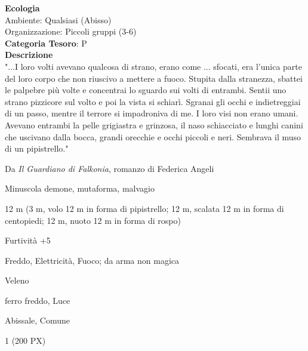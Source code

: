 \begin{multicols}{2}
{\textbf{Ecologia}\\
Ambiente: Qualsiasi (Abisso)\\
Organizzazione: Piccoli gruppi (3-6)\\
\textbf{Categoria Tesoro}: P\\
\textbf{Descrizione}\\
"...I loro volti avevano qualcosa di strano, erano come ... sfocati, era l'unica parte del loro corpo che non riuscivo a mettere a fuoco. Stupita dalla stranezza, sbattei le palpebre più volte e concentrai lo sguardo sui volti di entrambi. Sentii uno strano pizzicore sul volto e poi la vista si schiarì.
Sgranai gli occhi e indietreggiai di un passo, mentre il terrore si impadroniva di me. I loro visi non erano umani. Avevano entrambi la pelle grigiastra e grinzosa, il naso schiacciato e lunghi canini che uscivano dalla bocca, grandi orecchie e occhi piccoli e neri. Sembrava il muso di un pipistrello."

Da \emph{Il Guardiano di Falkonia}, romanzo di Federica Angeli

\begin{description}[noitemsep, topsep=0pt, parsep=0pt, partopsep=0pt, itemsep=1pt, leftmargin=2.35cm,  labelwidth=2.2cm, itemindent=0cm, listparindent=0pt] %
\setlength{\baselineskip}{10pt}
\item[\textbf{Taglia/Tipo}] Minuscola demone, mutaforma, malvagio
\item[\textbf{Caratt.}] 
\item[\textbf{Punti Ferita}] 
\item[\textbf{Movimento}] 12 m (3 m, volo 12 m in forma di pipistrello; 12 m, scalata 12 m in forma di centopiedi; 12 m, nuoto 12 m in forma di rospo)
\item[\textbf{Tiri Salvez.}] 
\item[\textbf{Comp.}] Furtività +5
\item[\textbf{Res. Danni}] Freddo, Elettricità, Fuoco; da arma non magica
\item[\textbf{Imm. Danni}] Veleno
\item[\textbf{Vulnerabilità}] ferro freddo, Luce
\item[\textbf{Sensi}] 
\item[\textbf{Linguaggi}] Abissale, Comune
\item[\textbf{Sfida}] 1 (200 PX)
\end{description}
\smallskip

}
\end{multicols}
